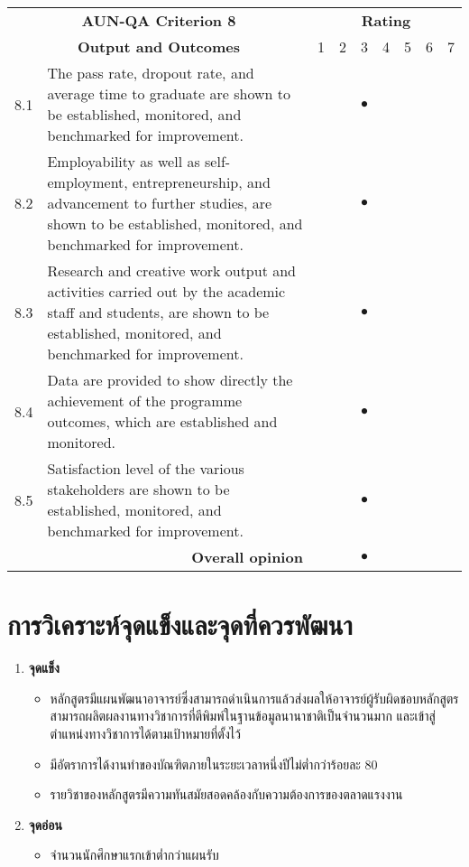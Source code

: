 \begin{longtable}{|c| p{}|p{0.3cm}|p{0.3cm}|c|p{0.3cm}|p{0.3cm}|p{0.3cm}|p{0.3cm}|}
	\hline
	\multicolumn{2}{|c|}{\bf AUN-QA Criterion 8}&\multicolumn{7}{c|}{\bf Rating}\\\cline{3-9}
	\multicolumn{2}{|c|}{\bf Output and Outcomes}&1&2&3&4&5&6&7\\\hline
	\endhead

8.1&The pass rate, dropout rate, and average time to graduate are shown to be established, monitored, and benchmarked for improvement.&&& {\huge{$\bullet$}}&&&&\\\hline

8.2&Employability as well as self-employment, entrepreneurship, and advancement to further studies, are shown to be established, monitored, and benchmarked for improvement.&&& {\huge{$\bullet$}}&&&&\\\hline

8.3&Research and creative work output and activities carried out by the academic staff and students, are shown to be established, monitored, and benchmarked for improvement.&&& {\huge{$\bullet$}}&&&&\\\hline

8.4&Data are provided to show directly the achievement of the programme outcomes, which are established and monitored.&&& {\huge{$\bullet$}}&&&&\\\hline

8.5&Satisfaction level of the various stakeholders are shown to be established, monitored, and benchmarked for improvement.&&& {\huge{$\bullet$}}&&&&\\\hline
	
\multicolumn{2}{|r|}{\bf Overall opinion}&&& {\huge{$\bullet$}}&&&&\\\hline
\end{longtable}

\section{การวิเคราะห์จุดแข็งและจุดที่ควรพัฒนา}
\begin{enumerate}
	\item[]\textbf{จุดแข็ง}
	\begin{itemize}[label=-]
		\item หลักสูตรมีแผนพัฒนาอาจารย์ซึ่งสามารถดำเนินการแล้วส่งผลให้อาจารย์ผู้รับผิดชอบหลักสูตรสามารถผลิตผลงานทางวิชาการที่ตีพิมพ์ในฐานข้อมูลนานาชาติเป็นจำนวนมาก และเข้าสู่ตำแหน่งทางวิชาการได้ตามเป้าหมายที่ตั้งไว้
		\item มีอัตราการได้งานทำของบัณฑิตภายในระยะเวลาหนึ่งปีไม่ต่ำกว่าร้อยละ 80
		\item รายวิชาของหลักสูตรมีความทันสมัยสอดคล้องกับความต้องการของตลาดแรงงาน
	\end{itemize}
\item[]\textbf{จุดอ่อน}
	\begin{itemize}[label=-]
	\item จำนวนนักศึกษาแรกเข้าต่ำกว่าแผนรับ
	\end{itemize}
\end{enumerate}
